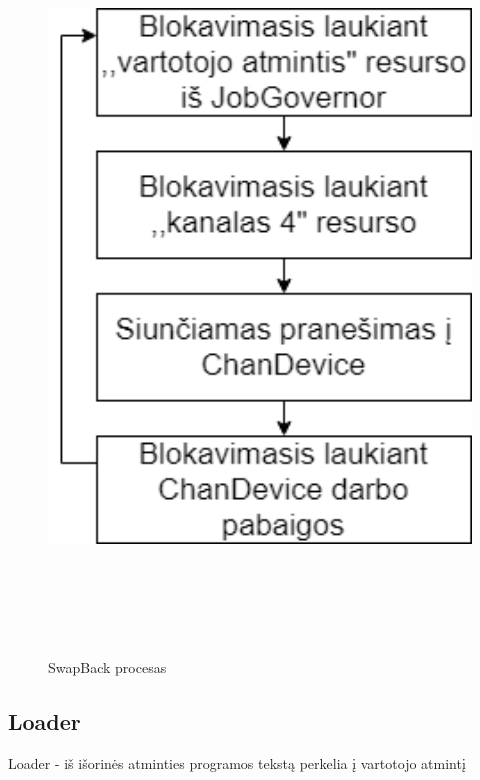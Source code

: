 \documentclass[oneside]{VUMIFPSkursinis}
\begin{document}
\begin{figure}[H]
		\centering	
	\includegraphics[width=18cm,height=20cm,keepaspectratio]{SwapBack.png}
	\caption{SwapBack procesas}
	\label{fig:SwapBack procesas}
\end{figure}

\subsection{Loader} Loader - iš išorinės atminties programos tekstą perkelia į vartotojo atmintį
\end{document}
